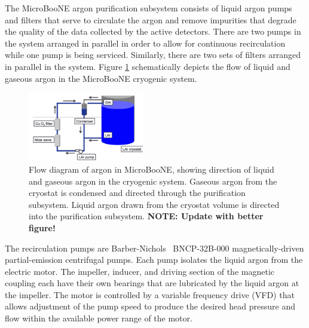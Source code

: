 The MicroBooNE argon purification subsystem consists of liquid argon pumps and filters that serve to circulate the argon and remove impurities that degrade the quality of the data collected by the active detectors.  There are two pumps in the system arranged in parallel in order to allow for continuous recirculation while one pump is being serviced.  Similarly, there are two sets of filters arranged in parallel in the system.  Figure \ref{flowdiagram} schematically depicts the flow of liquid and gaseous argon in the MicroBooNE cryogenic system.

\begin{figure}
\centering 
\includegraphics[width=0.45\textwidth]{figures/flow_diagram.jpg}
\caption{Flow diagram of argon in MicroBooNE, showing direction of liquid and gaseous argon in the cryogenic system.  Gaseous argon from the cryostat is condensed and directed through the purification subsystem. Liquid argon drawn from the cryostat volume is directed into the purification subsystem.  \textbf{NOTE: Update with better figure!}}
\label{flowdiagram}
\end{figure}



The recirculation pumps are Barber-Nichols~\cite{barber-nichols} BNCP-32B-000 magnetically-driven partial-emission centrifugal pumps.  Each pump isolates the liquid argon from the electric motor.  The impeller, inducer, and driving section of the magnetic coupling each have their own bearings that are lubricated by the liquid argon at the impeller.  The motor is controlled by a variable frequency drive (VFD) that allows adjustment of the pump speed to produce the desired head pressure and flow within the available power range of the motor.    


